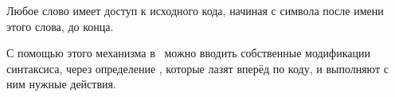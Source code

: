 \clearpage
{}\label{instream}\secdown

Любое слово имеет доступ к  исходного кода, начиная с 
символа после имени этого слова, до конца.

С помощью этого механизма в \F\ можно вводить собственные модификации
синтаксиса, через определение , которые лазят вперёд по коду, и
выполняют с ним нужные действия.

\secup
